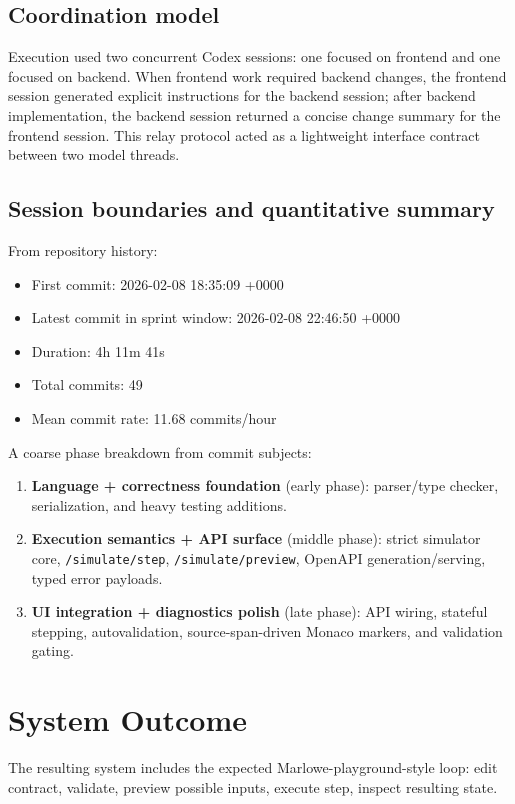 \documentclass[11pt]{article}
\begin{document}
\subsection{Coordination model}
Execution used two concurrent Codex sessions: one focused on frontend and one focused on backend. When frontend work required backend changes, the frontend session generated explicit instructions for the backend session; after backend implementation, the backend session returned a concise change summary for the frontend session. This relay protocol acted as a lightweight interface contract between two model threads.

\subsection{Session boundaries and quantitative summary}
From repository history:

\begin{itemize}
  \item First commit: 2026-02-08 18:35:09 +0000
  \item Latest commit in sprint window: 2026-02-08 22:46:50 +0000
  \item Duration: 4h 11m 41s
  \item Total commits: 49
  \item Mean commit rate: 11.68 commits/hour
\end{itemize}

A coarse phase breakdown from commit subjects:
\begin{enumerate}
  \item \textbf{Language + correctness foundation} (early phase): parser/type checker, serialization, and heavy testing additions.
  \item \textbf{Execution semantics + API surface} (middle phase): strict simulator core, \texttt{/simulate/step}, \texttt{/simulate/preview}, OpenAPI generation/serving, typed error payloads.
  \item \textbf{UI integration + diagnostics polish} (late phase): API wiring, stateful stepping, autovalidation, source-span-driven Monaco markers, and validation gating.
\end{enumerate}

\section{System Outcome}
The resulting system includes the expected Marlowe-playground-style loop: edit contract, validate, preview possible inputs, execute step, inspect resulting state.
\end{document}

